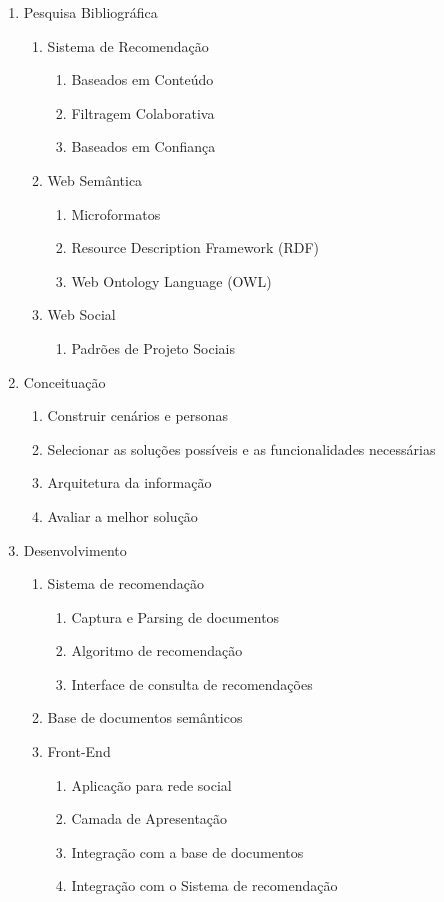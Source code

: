 \documentclass[]{article}
\begin{document}
\begin{enumerate}
		
	\item Pesquisa Bibliográfica
	\begin{enumerate}
		\item Sistema de Recomendação
		\begin{enumerate}
			\item Baseados em Conteúdo
			\item Filtragem Colaborativa
			\item Baseados em Confiança
		\end{enumerate}
		\item Web Semântica
		\begin{enumerate}
		  \item Microformatos
			\item Resource Description Framework (RDF)
			\item Web Ontology Language (OWL)
		\end{enumerate}
		\item Web Social
		\begin{enumerate}
		  \item Padrões de Projeto Sociais
		\end{enumerate}
	\end{enumerate}
	
	\item Conceituação
	\begin{enumerate}
		\item Construir cenários e personas
		\item Selecionar as soluções possíveis e as funcionalidades necessárias
		\item Arquitetura da informação
		\item Avaliar a melhor solução
	\end{enumerate}
		
	\item Desenvolvimento
	\begin{enumerate}
		\item Sistema de recomendação
		\begin{enumerate}
			\item Captura e Parsing de documentos
			\item Algoritmo de recomendação
			\item Interface de consulta de recomendações
		\end{enumerate}
		\item Base de documentos semânticos
		\item Front-End
		\begin{enumerate}
			\item Aplicação para rede social
			\item Camada de Apresentação
			\item Integração com a base de documentos
			\item Integração com o Sistema de recomendação
		\end{enumerate}
	\end{enumerate}
	
\end{enumerate}
\end{document}
